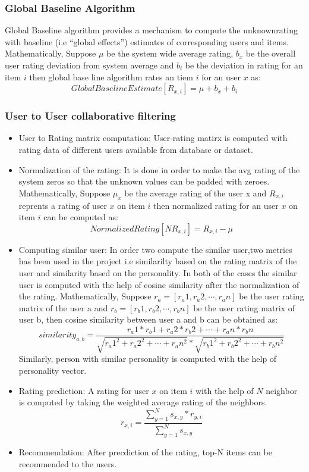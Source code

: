 \subsubsection{Global Baseline Algorithm}
Global Baseline algorithm provides a mechanism to compute the unknownrating with baseline (i.e ``global effects'') estimates of corresponding users and items.
Mathematically,
Suppose $\mu$ be the system wide average rating, $b_x$ be the overall user rating deviation from system average and $b_i$ be the deviation in rating for an item $i$ then global base line algorithm rates an tiem $i$ for an user $x$ as:
\begin{equation}\label{eq:baseline}
	Global Baseline Estimate[R_{x,i}] = \mu + b_x + b_i
\end{equation}
\subsubsection{User to User collaborative filtering}
\begin{itemize}
	\item User to Rating matrix computation: User-rating matirx is computed with rating data of different users available from database or dataset.
	\item Normalization of the rating: It is done in order to make the avg rating of the system zeros so that the unknown values can be padded with zeroes.
Mathematically,
Suppose $\mu_x$ be the average rating of the user x and $R_{x,i}$ reprents a rating of user $x$ on item $i$ then normalized rating for an user $x$ on item $i$ can be computed as:
\begin{equation}\label{eq:normal}
	Normalized Rating[NR_{x,i}] = R_{x,i} - \mu
\end{equation}
\item Computing similar user: In order two compute the similar user,two metrics has been used in the project i.e similarilty based on the rating matrix of the user and similarity based on the personality. In both of the cases the similar user is computed with the help of cosine similarity after the normalization of the rating.
Mathematically,
Suppose $r_a = [r_a1,r_a2,\cdots,r_an]$ be the user rating matrix of the user a and  $r_b = [r_b1,r_b2,\cdots,r_bn]$ be the user rating matrix of user b, then cosine similarity between user a and b can be obtained as:
\begin{equation}
	similarity_{a,b} = \frac{r_a1*r_b1 + r_a2*r_b2 +\cdots+ r_an*r_bn}{\sqrt{{r_a1}^2+{r_a2}^2+\cdots+{r_an}^2} * \sqrt{{r_b1}^2+{r_b2}^2+\cdots+{r_bn}^2} }  
\end{equation}
Similarly, person with similar personality is computed with the help of personality vector.
\item Rating prediction: A rating for user $x$ on item $i$ with the help of $N$ neighbor is computed by taking the weighted average rating of the neighbors.
\begin{equation}\label{eq:cf}
	r_{x,i} = \frac{\sum_{y=1}^N s_{x,y}*r_{y,i}}{\sum_{y=1}^N s_{x,y}}
\end{equation}
\item Recommendation: After precdiction of the rating, top-N items can be recommended to the users.
\end{itemize}

